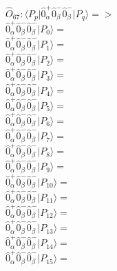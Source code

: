 \documentclass[14pt]{article}
\begin{document}
    $\hat{O}_{67}:  \langle{P_p}\vert \hat{0}_{\alpha}^{+}\hat{0}_{\beta}^{-}\hat{0}_{\beta}^{-} \vert{P_q}\rangle => $ \\ 
    $ \hat{0}_{\alpha}^{+}\hat{0}_{\beta}^{-}\hat{0}_{\beta}^{-} \vert{P_{0}}\rangle =  $ \\ 
    $ \hat{0}_{\alpha}^{+}\hat{0}_{\beta}^{-}\hat{0}_{\beta}^{-} \vert{P_{1}}\rangle =  $ \\ 
    $ \hat{0}_{\alpha}^{+}\hat{0}_{\beta}^{-}\hat{0}_{\beta}^{-} \vert{P_{2}}\rangle =  $ \\ 
    $ \hat{0}_{\alpha}^{+}\hat{0}_{\beta}^{-}\hat{0}_{\beta}^{-} \vert{P_{3}}\rangle =  $ \\ 
    $ \hat{0}_{\alpha}^{+}\hat{0}_{\beta}^{-}\hat{0}_{\beta}^{-} \vert{P_{4}}\rangle =  $ \\ 
    $ \hat{0}_{\alpha}^{+}\hat{0}_{\beta}^{-}\hat{0}_{\beta}^{-} \vert{P_{5}}\rangle =  $ \\ 
    $ \hat{0}_{\alpha}^{+}\hat{0}_{\beta}^{-}\hat{0}_{\beta}^{-} \vert{P_{6}}\rangle =  $ \\ 
    $ \hat{0}_{\alpha}^{+}\hat{0}_{\beta}^{-}\hat{0}_{\beta}^{-} \vert{P_{7}}\rangle =  $ \\ 
    $ \hat{0}_{\alpha}^{+}\hat{0}_{\beta}^{-}\hat{0}_{\beta}^{-} \vert{P_{8}}\rangle =  $ \\ 
    $ \hat{0}_{\alpha}^{+}\hat{0}_{\beta}^{-}\hat{0}_{\beta}^{-} \vert{P_{9}}\rangle =  $ \\ 
    $ \hat{0}_{\alpha}^{+}\hat{0}_{\beta}^{-}\hat{0}_{\beta}^{-} \vert{P_{10}}\rangle =  $ \\ 
    $ \hat{0}_{\alpha}^{+}\hat{0}_{\beta}^{-}\hat{0}_{\beta}^{-} \vert{P_{11}}\rangle =  $ \\ 
    $ \hat{0}_{\alpha}^{+}\hat{0}_{\beta}^{-}\hat{0}_{\beta}^{-} \vert{P_{12}}\rangle =  $ \\ 
    $ \hat{0}_{\alpha}^{+}\hat{0}_{\beta}^{-}\hat{0}_{\beta}^{-} \vert{P_{13}}\rangle =  $ \\ 
    $ \hat{0}_{\alpha}^{+}\hat{0}_{\beta}^{-}\hat{0}_{\beta}^{-} \vert{P_{14}}\rangle =  $ \\ 
    $ \hat{0}_{\alpha}^{+}\hat{0}_{\beta}^{-}\hat{0}_{\beta}^{-} \vert{P_{15}}\rangle =  $ \\ 
    
\end{document}
